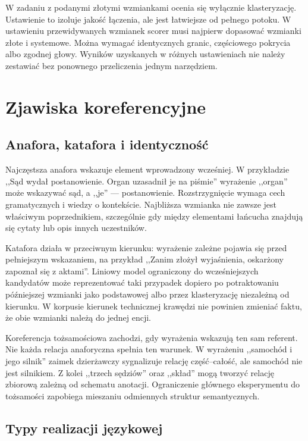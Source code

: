 W zadaniu z podanymi złotymi wzmiankami ocenia się wyłącznie klasteryzację. Ustawienie to izoluje jakość łączenia, ale jest łatwiejsze od pełnego potoku. W ustawieniu przewidywanych wzmianek scorer musi najpierw dopasować wzmianki złote i systemowe. Można wymagać identycznych granic, częściowego pokrycia albo zgodnej głowy. Wyników uzyskanych w różnych ustawieniach nie należy zestawiać bez ponownego przeliczenia jednym narzędziem.

\section{Zjawiska koreferencyjne}
\label{sec:zjawiska-coref}

\subsection{Anafora, katafora i identyczność}

Najczęstsza anafora wskazuje element wprowadzony wcześniej. W przykładzie ,,Sąd wydał postanowienie. Organ uzasadnił je na piśmie'' wyrażenie ,,organ'' może wskazywać sąd, a ,,je'' --- postanowienie. Rozstrzygnięcie wymaga cech gramatycznych i wiedzy o kontekście. Najbliższa wzmianka nie zawsze jest właściwym poprzednikiem, szczególnie gdy między elementami łańcucha znajdują się cytaty lub opis innych uczestników.

Katafora działa w przeciwnym kierunku: wyrażenie zależne pojawia się przed pełniejszym wskazaniem, na przykład ,,Zanim złożył wyjaśnienia, oskarżony zapoznał się z aktami''. Liniowy model ograniczony do wcześniejszych kandydatów może reprezentować taki przypadek dopiero po potraktowaniu późniejszej wzmianki jako podstawowej albo przez klasteryzację niezależną od kierunku. W korpusie kierunek technicznej krawędzi nie powinien zmieniać faktu, że obie wzmianki należą do jednej encji.

Koreferencja tożsamościowa zachodzi, gdy wyrażenia wskazują ten sam referent. Nie każda relacja anaforyczna spełnia ten warunek. W wyrażeniu ,,samochód i jego silnik'' zaimek dzierżawczy sygnalizuje relację część--całość, ale samochód nie jest silnikiem. Z kolei ,,trzech sędziów'' oraz ,,skład'' mogą tworzyć relację zbiorową zależną od schematu anotacji. Ograniczenie głównego eksperymentu do tożsamości zapobiega mieszaniu odmiennych struktur semantycznych.

\subsection{Typy realizacji językowej}

